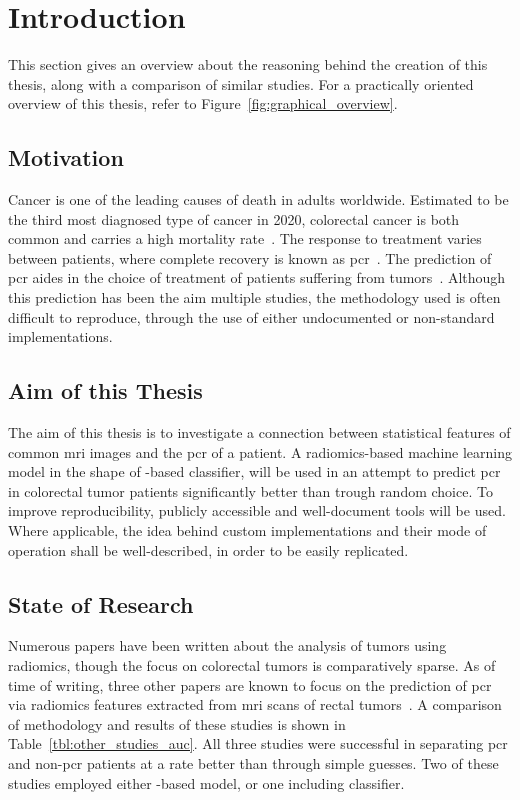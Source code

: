 \section{Introduction}

This section gives an overview about the reasoning behind the creation of this 
thesis, along with a comparison of similar studies. For a practically oriented overview of this thesis, refer to Figure~\ref{fig:graphical_overview}.

\subsection{Motivation}

Cancer is one of the leading causes of death in adults worldwide. Estimated to
be the third most diagnosed type of cancer in 2020, colorectal cancer is both 
common and carries a high mortality rate~\cite{cancer_stats_2020}. The response to treatment varies 
between patients, where complete recovery is known as \acf{pcr}~\cite{Zorcolo2012}.
The prediction of \ac{pcr} aides in the choice of treatment of patients suffering
from tumors~\cite{radiomics_analysis_pcr_rectal}. Although this prediction has 
been the aim multiple studies, the methodology used is often difficult to 
reproduce, through the use of either undocumented or non-standard
implementations. 

\subsection{Aim of this Thesis}

The aim of this thesis is to investigate a connection between statistical 
features of common \ac{mri} images and the \ac{pcr} of a patient.
A radiomics-based
machine learning model in the shape of -based classifier, will be used 
in an attempt to predict \ac{pcr} in 
colorectal tumor patients significantly better than trough random choice.
To improve reproducibility, publicly accessible and well-document tools will be 
used. Where applicable, the idea behind custom implementations and their mode
of operation shall be well-described, in order to be easily replicated.


\subsection{State of Research}\label{sec:state_of_research}

Numerous papers have been written about the analysis of tumors using radiomics,
though the focus on colorectal tumors is comparatively sparse. As of time of 
writing, three other papers are known to focus on the prediction 
of \ac{pcr} via radiomics features extracted from \ac{mri} scans of rectal 
tumors~\cite{radiomics_analysis_pcr_rectal,rectal_radiomics_svm_rf,multisite_rectal_radiomics}.
A comparison of methodology and results of these studies is shown in 
Table~\ref{tbl:other_studies_auc}. All three studies were successful in 
separating \ac{pcr} and non-\ac{pcr} patients at a rate better than through 
simple guesses. Two of these studies employed either -based model, or
one including  classifier.

